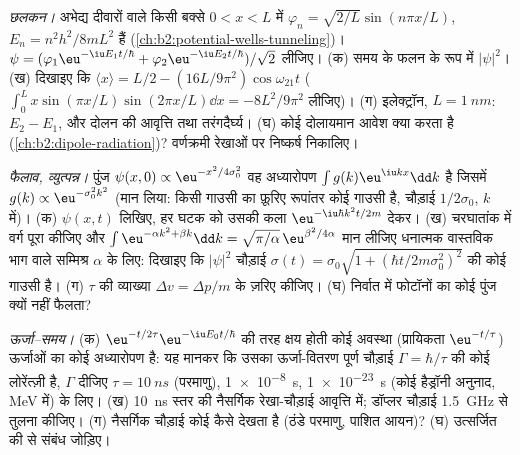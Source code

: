 \begin{exercise}[$\star\star\star$]\label{exo:b2:schrodinger-wave-functions:10}
\emph{छलकन।} अभेद्य दीवारों वाले किसी बक्से $0 < x < L$ में
 $\varphi_n = \sqrt{2/L}\sin(n\pi x/L)$, $E_n =
n^2h^2/8mL^2$ हैं (\cref{ch:b2:potential-wells-tunneling})। $\psi =
(\varphi_1\eu^{-\iu E_1t/\hbar} + \varphi_2\eu^{-\iu E_2t/\hbar})/\sqrt2$ लीजिए। (क)
समय के फलन के रूप में $|\psi|^2$। (ख) दिखाइए कि $\langle x\rangle = L/2 -
(16L/9\pi^2)\cos\omega_{21}t$ ($\int_0^L x\sin(\pi x/L)\sin(2\pi x/L)\dd x
= -8L^2/9\pi^2$ लीजिए)। (ग) इलेक्ट्रॉन, $L = \qty{1}{nm}$: $E_2 - E_1$, और दोलन की
आवृत्ति तथा तरंगदैर्घ्य। (घ) कोई दोलायमान आवेश क्या करता है
(\cref{ch:b2:dipole-radiation})? वर्णक्रमी रेखाओं पर निष्कर्ष निकालिए।
\end{exercise}

\begin{exercise}[$\star\star\star$]\label{exo:b2:schrodinger-wave-functions:11}
\emph{फैलाव, व्युत्पन्न।} पुंज $\psi(x,0) \propto \eu^{-x^2/4\sigma_0^2}$
वह अध्यारोपण $\int g(k)\eu^{\iu kx}\dd k$ है जिसमें $g(k) \propto
\eu^{-\sigma_0^2k^2}$ (मान लिया: किसी गाउसी का फ़ूरिए रूपांतर कोई
गाउसी है, चौड़ाई $1/2\sigma_0$, $k$ में)। (क) $\psi(x,t)$ लिखिए, हर घटक को
उसकी कला $\eu^{-\iu\hbar k^2t/2m}$ देकर। (ख) चरघातांक में वर्ग पूरा
कीजिए और $\int\eu^{-\alpha k^2 + \beta k}\dd k = \sqrt{\pi/\alpha}\,
\eu^{\beta^2/4\alpha}$ मान लीजिए धनात्मक वास्तविक भाग वाले सम्मिश्र $\alpha$ के लिए: दिखाइए कि
$|\psi|^2$ चौड़ाई $\sigma(t) = \sigma_0\sqrt{1 + (\hbar t/2m
\sigma_0^2)^2}$ की कोई गाउसी है। (ग) $\tau$ की व्याख्या $\Delta v = \Delta p/m$ के ज़रिए कीजिए। (घ) निर्वात में
फोटॉनों का कोई पुंज क्यों नहीं फैलता?
\end{exercise}

\begin{exercise}[$\star\star\star$]\label{exo:b2:schrodinger-wave-functions:12}
\emph{ऊर्जा--समय।} (क) $\eu^{-t/2\tau}\eu^{-\iu E_0t/\hbar}$ की तरह क्षय होती कोई अवस्था
(प्रायिकता $\eu^{-t/\tau}$) ऊर्जाओं का कोई अध्यारोपण है: यह मानकर
कि उसका ऊर्जा-वितरण पूर्ण चौड़ाई $\Gamma =
\hbar/\tau$ की कोई लोरेंत्ज़ी है, $\Gamma$ दीजिए $\tau = \qty{10}{ns}$ (परमाणु), \qty{1e-8}{s},
\qty{1e-23}{s} (कोई हैड्रॉनी अनुनाद, \unit{MeV} में) के लिए। (ख) \qty{10}{ns}
स्तर की नैसर्गिक रेखा-चौड़ाई आवृत्ति में; डॉप्लर चौड़ाई
\qty{1.5}{GHz} से तुलना कीजिए। (ग) नैसर्गिक चौड़ाई कोई कैसे देखता है (ठंडे परमाणु,
पाशित आयन)? (घ) उत्सर्जित  की
 से संबंध जोड़िए।
\end{exercise}

